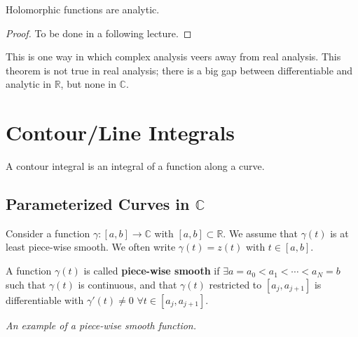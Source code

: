 \begin{theorem}
Holomorphic functions are analytic.
\end{theorem}

\begin{proof}
To be done in a following lecture.
\end{proof}

\begin{remark}
This is one way in which complex analysis veers away from real analysis. This theorem is not true in real analysis; there is a big gap between differentiable and analytic in $\mathbb{R}$, but none in $\mathbb{C}$.
\end{remark}

\section{Contour/Line Integrals}
A contour integral is an integral of a function along a curve.

\subsection{Parameterized Curves in $\mathbb{C}$}

Consider a function $\gamma:[a,b] \rightarrow \mathbb{C}$ with $[a,b] \subset \mathbb{R}$. We assume that $\gamma(t)$ is at least piece-wise smooth. We often write $\gamma(t)=z(t)$ with $t\in [a,b]$.


\begin{definition}
A function $\gamma(t)$ is called \textbf{piece-wise smooth} if $\exists a=a_0<a_1< \cdots < a_N = b$ such that $\gamma(t)$ is continuous, and that $\gamma(t)$ restricted to $[a_j,a_{j+1}]$ is differentiable with $\gamma'(t)\neq 0$ $\forall t\in [a_j,a_{j+1}]$.
\end{definition}

\begin{center}


\textit{An example of a piece-wise smooth function.}
\end{center}


